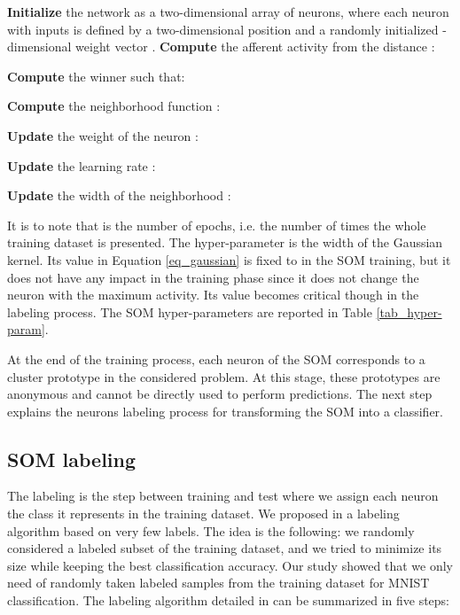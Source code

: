 \documentclass[runningheads]{llncs}
\begin{document}
\begin{algorithmic}[]
    \STATE
    \STATE \textbf{Initialize} the network as a two-dimensional array of  neurons, where each neuron  with  inputs is defined by a two-dimensional position  and a randomly initialized -dimensional weight vector .
                \STATE \textbf{Compute} the afferent activity  from the distance :
                    
                    
            \ENDFOR
        	\STATE \textbf{Compute} the winner  such that:
            	
            	\STATE \textbf{Compute} the neighborhood function :
                
                \STATE \textbf{Update} the weight  of the neuron :
                
            \ENDFOR
        \ENDFOR
        \STATE \textbf{Update} the learning rate :
        
        \STATE \textbf{Update} the width of the neighborhood :
        
	\ENDFOR
\end{algorithmic}

It is to note that  is the number of epochs, i.e. the number of times the whole training dataset is presented.
The  hyper-parameter is the width of the Gaussian kernel. Its value in Equation \ref{eq_gaussian} is fixed to  in the SOM training, but it does not have any impact in the training phase since it does not change the neuron with the maximum activity. Its value becomes critical though in the labeling process.
The SOM hyper-parameters are reported in Table \ref{tab_hyper-param}.

At the end of the training process, each neuron of the SOM corresponds to a cluster prototype in the considered problem. At this stage, these prototypes are anonymous and cannot be directly used to perform predictions. The next step explains the neurons labeling process for transforming the SOM into a classifier.

\subsection{SOM labeling}
\label{sec_som-labeling}
The labeling is the step between training and test where we assign each neuron the class it represents in the training dataset. We proposed in \cite{khacef2019self-organizing_neurons} a labeling algorithm based on very few labels. The idea is the following: we randomly considered a labeled subset of the training dataset, and we tried to minimize its size while keeping the best classification accuracy. Our study showed that we only need  of randomly taken labeled samples from the training dataset for MNIST classification.
The labeling algorithm detailed in \cite{khacef2019self-organizing_neurons} can be summarized in five steps:
\end{document}
